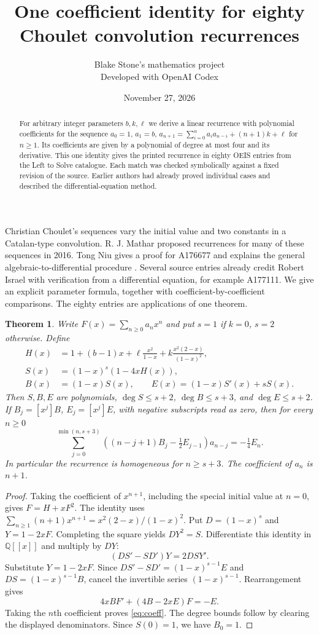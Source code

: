 \documentclass[11pt]{article}
\title{One coefficient identity for eighty Choulet convolution recurrences}
\author{Blake Stone's mathematics project\\\small Developed with OpenAI Codex}
\date{November 27, 2026}
\newtheorem{theorem}{Theorem}
\begin{document}
\maketitle
\begin{abstract}
For arbitrary integer parameters $b,k,\ell$ we derive a linear recurrence with polynomial coefficients for the sequence $a_0=1$, $a_1=b$,
$a_{n+1}=\sum_{i=0}^n a_i a_{n-i}+(n+1)k+\ell$ for $n\ge1$. Its coefficients are given by a polynomial of degree at most four and its derivative. This one identity gives the printed recurrence in eighty OEIS entries from the Left to Solve catalogue. Each match was checked symbolically against a fixed revision of the source. Earlier authors had already proved individual cases and described the differential-equation method.
\end{abstract}

Christian Choulet's sequences vary the initial value and two constants in a Catalan-type convolution. R. J. Mathar proposed recurrences for many of these sequences in 2016. Tong Niu gives a proof for A176677 and explains the general algebraic-to-differential procedure \cite{niu}. Several source entries already credit Robert Israel with verification from a differential equation, for example A177111. We give an explicit parameter formula, together with coefficient-by-coefficient comparisons. The eighty entries are applications of one theorem.

\begin{theorem}
Write $F(x)=\sum_{n\ge0}a_nx^n$ and put $s=1$ if $k=0$, $s=2$ otherwise. Define
\begin{align*}
 H(x)&=1+(b-1)x+\ell\frac{x^2}{1-x}+k\frac{x^2(2-x)}{(1-x)^2},\\
 S(x)&=(1-x)^s(1-4xH(x)),\\
 B(x)&=(1-x)S(x),\qquad E(x)=(1-x)S'(x)+sS(x).
\end{align*}
Then $S,B,E$ are polynomials, $\deg S\le s+2$, $\deg B\le s+3$, and $\deg E\le s+2$. If $B_j=[x^j]B$, $E_j=[x^j]E$, with negative subscripts read as zero, then for every $n\ge0$
\begin{equation}\label{eq:coeff}
 \sum_{j=0}^{\min(n,s+3)}
 \left((n-j+1)B_j-\tfrac12 E_{j-1}\right)a_{n-j}
 =-\tfrac14 E_n .
\end{equation}
In particular the recurrence is homogeneous for $n\ge s+3$. The coefficient of $a_n$ is $n+1$.
\end{theorem}

\begin{proof}
Taking the coefficient of $x^{n+1}$, including the special initial value at $n=0$, gives $F=H+xF^2$. The identity uses $\sum_{n\ge1}(n+1)x^{n+1}=x^2(2-x)/(1-x)^2$. Put $D=(1-x)^s$ and $Y=1-2xF$. Completing the square yields $D Y^2=S$. Differentiate this identity in $\mathbb Q[[x]]$ and multiply by $D Y$:
\[
 (D S'-S D')Y=2 D S Y' .
\]
Substitute $Y=1-2xF$. Since $D S'-S D'=(1-x)^{s-1}E$ and $D S=(1-x)^{s-1}B$, cancel the invertible series $(1-x)^{s-1}$. Rearrangement gives
\[
 4xB F'+(4B-2xE)F=-E .
\]
Taking the $n$th coefficient proves \eqref{eq:coeff}. The degree bounds follow by clearing the displayed denominators. Since $S(0)=1$, we have $B_0=1$.
\end{proof}
\end{document}
